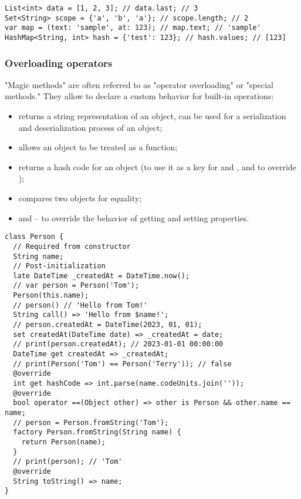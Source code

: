 \begin{lstlisting}
List<int> data = [1, 2, 3]; // data.last; // 3
Set<String> scope = {'a', 'b', 'a'}; // scope.length; // 2
var map = (text: 'sample', at: 123); // map.text; // 'sample'
HashMap<String, int> hash = {'test': 123}; // hash.values; // [123]
\end{lstlisting}


\subsubsection{Overloading operators}

"Magic methods" are often referred to as "operator overloading" or "special methods." They allow to declare a custom 
behavior for built-in operations:

\begin{itemize}
  \item {} returns a string representation of an object, can be used for a serialization and deserialization 
  process of an object;
  \item {} allows an object to be treated as a function;
  \item {} returns a hash code for an object (to use it as a key for  and , and to override \q{==});
  \item {} compares two objects for equality;
  \item {} and  -- to override the behavior of getting and setting properties.
\end{itemize}

\begin{lstlisting}
class Person {
  // Required from constructor
  String name;
  // Post-initialization
  late DateTime _createdAt = DateTime.now();
  // var person = Person('Tom');
  Person(this.name);
  // person() // 'Hello from Tom!'
  String call() => 'Hello from $name!';
  // person.createdAt = DateTime(2023, 01, 01);
  set createdAt(DateTime date) => _createdAt = date;
  // print(person.createdAt); // 2023-01-01 00:00:00
  DateTime get createdAt => _createdAt;
  // print(Person('Tom') == Person('Terry')); // false
  @override
  int get hashCode => int.parse(name.codeUnits.join(''));
  @override
  bool operator ==(Object other) => other is Person && other.name == name;
  // person = Person.fromString('Tom');
  factory Person.fromString(String name) {
    return Person(name);
  }
  // print(person); // 'Tom'
  @override
  String toString() => name;
}
\end{lstlisting}



